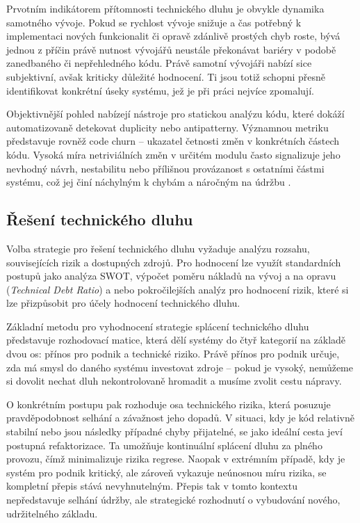 \documentclass[FM,DP,fonts]{tulthesis}
\begin{document}
Prvotním indikátorem přítomnosti technického dluhu je obvykle dynamika samotného vývoje. Pokud se rychlost vývoje snižuje a čas potřebný k implementaci nových funkcionalit či opravě zdánlivě prostých chyb roste, bývá jednou z příčin právě nutnost vývojářů neustále překonávat bariéry v podobě zanedbaného či nepřehledného kódu. Právě samotní vývojáři nabízí sice subjektivní, avšak kriticky důležité hodnocení. Ti jsou totiž schopni přesně identifikovat konkrétní úseky systému, jež je při práci nejvíce zpomalují.

Objektivnější pohled nabízejí nástroje pro statickou analýzu kódu, které dokáží automatizovaně detekovat duplicity nebo antipatterny. Významnou metriku představuje rovněž code churn – ukazatel četnosti změn v konkrétních částech kódu. Vysoká míra netriviálních změn v určitém modulu často signalizuje jeho nevhodný návrh, nestabilitu nebo přílišnou provázanost s ostatními částmi systému, což jej činí náchylným k chybám a náročným na údržbu \parencite{asana-technical-debt}.

\subsection{Řešení technického dluhu}
Volba strategie pro řešení technického dluhu vyžaduje analýzu rozsahu, souvisejících rizik a dostupných zdrojů. Pro hodnocení lze využít standardních postupů jako analýza SWOT, výpočet poměru nákladů na vývoj a na opravu (\textit{Technical Debt Ratio}) a nebo pokročilejších analýz pro hodnocení rizik, které si lze přizpůsobit pro účely hodnocení technického dluhu. \parencite{sonar-technical-debt-ratio}

Základní metodu pro vyhodnocení strategie splácení technického dluhu představuje rozhodovací matice, která dělí systémy do čtyř kategorií na základě dvou os: přínos pro podnik a technické  riziko. Právě přínos pro podnik určuje, zda má smysl do daného systému investovat zdroje – pokud je vysoký, nemůžeme si dovolit nechat dluh nekontrolovaně hromadit a musíme zvolit cestu nápravy.

O konkrétním postupu pak rozhoduje osa technického rizika, která posuzuje pravděpodobnost selhání a závažnost jeho dopadů. V situaci, kdy je kód relativně stabilní nebo jsou následky případné chyby přijatelné, se jako ideální cesta jeví postupná refaktorizace. Ta umožňuje kontinuální splácení dluhu za plného provozu, čímž minimalizuje rizika regrese. Naopak v extrémním případě, kdy je systém pro podnik kritický, ale zároveň vykazuje neúnosnou míru rizika, se kompletní přepis stává nevyhnutelným. Přepis tak v tomto kontextu nepředstavuje selhání údržby, ale strategické rozhodnutí o vybudování nového, udržitelného základu.
\end{document}
